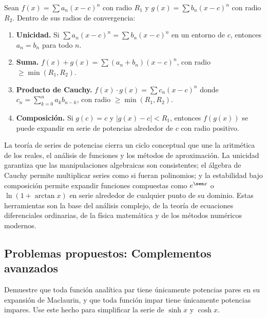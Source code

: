 \begin{theorem}
\label{thm:algebra_series}
Sean $f(x) = \sum a_n(x-c)^n$ con radio $R_1$ y
$g(x) = \sum b_n(x-c)^n$ con radio $R_2$. Dentro de sus radios de
convergencia:
\begin{enumerate}
    \item \textbf{Unicidad.} Si $\sum a_n(x-c)^n = \sum b_n(x-c)^n$
          en un entorno de $c$, entonces $a_n = b_n$ para todo $n$.
    \item \textbf{Suma.} $f(x)+g(x) = \sum (a_n+b_n)(x-c)^n$,
          con radio $\geq \min(R_1,R_2)$.
    \item \textbf{Producto de Cauchy.}
          $f(x)\cdot g(x) = \sum c_n(x-c)^n$ donde
          $c_n = \sum_{k=0}^n a_k b_{n-k}$, con radio
          $\geq \min(R_1,R_2)$.
    \item \textbf{Composición.} Si $g(c) = c$ y $|g(x)-c| < R_1$,
          entonces $f(g(x))$ se puede expandir en serie de potencias
          alrededor de $c$ con radio positivo.
\end{enumerate}
\end{theorem}

\begin{rem}
La teoría de series de potencias cierra un ciclo conceptual que une
la aritmética de los reales, el análisis de funciones y los métodos
de aproximación. La unicidad garantiza que las manipulaciones
algebraicas son consistentes; el álgebra de Cauchy permite multiplicar
series como si fueran polinomios; y la estabilidad bajo composición
permite expandir funciones compuestas como $e^{\sen x}$ o
$\ln(1 + \arctan x)$ en serie alrededor de cualquier punto de su
dominio. Estas herramientas son la base del análisis complejo, de la
teoría de ecuaciones diferenciales ordinarias, de la física matemática
y de los métodos numéricos modernos.
\end{rem}

\subsection{Problemas propuestos: Complementos avanzados}



\begin{prob}
 Demuestre que toda función analítica par tiene únicamente
          potencias pares en su expansión de Maclaurin, y que toda
          función impar tiene únicamente potencias impares. Use este
          hecho para simplificar la serie de $\sinh x$ y $\cosh x$.
\end{prob}

